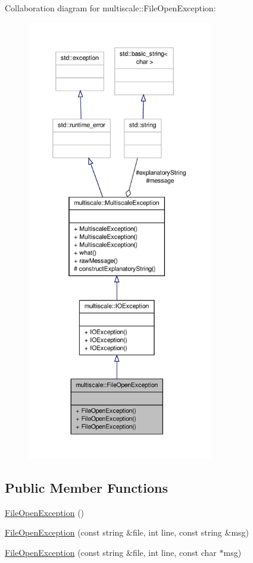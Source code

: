 Collaboration diagram for multiscale\-:\-:File\-Open\-Exception\-:\nopagebreak
\begin{figure}[H]
\begin{center}
\leavevmode
\includegraphics[height=550pt]{classmultiscale_1_1FileOpenException__coll__graph}
\end{center}
\end{figure}
\subsection*{Public Member Functions}
\begin{DoxyCompactItemize}
\item 
\hyperlink{classmultiscale_1_1FileOpenException_a68434b875352a75a6692f42cbf2ece20}{File\-Open\-Exception} ()
\item 
\hyperlink{classmultiscale_1_1FileOpenException_ae574327fb5ac6e396d8c37263f8a2815}{File\-Open\-Exception} (const string \&file, int line, const string \&msg)
\item 
\hyperlink{classmultiscale_1_1FileOpenException_adddaf8af54fd3bdeb5f63d5a6736fd45}{File\-Open\-Exception} (const string \&file, int line, const char $\ast$msg)
\end{DoxyCompactItemize}

